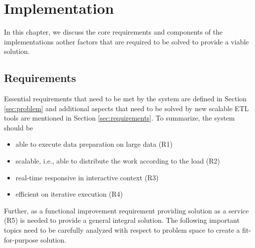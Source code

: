 
\chapter{Implementation} %
\label{Chapter3} %


In this chapter, we discuss the core requirements and components of the implementations aother factors that are required to be solved to provide a viable solution.  
\section{Requirements }
\label{sec:fundamentals}
Essential requirements that need to be met by the system are defined in Section \ref{sec:problem} and additional aspects that need to be solved by new scalable ETL tools are mentioned in Section \ref{sec:requirements}. To summarize, the system should be 
\begin{itemize}
\item  able to execute data preparation on large data (R1)
\item  scalable, i.e., able to distribute the work according to the load  (R2)
\item real-time responsive in interactive context (R3)
\item efficient on iterative execution (R4)
\end{itemize}
Further, as a functional improvement requirement providing solution as a service (R5) is needed to provide a general integral solution.  The following important topics need to be carefully analyzed with respect to problem space to create a fit-for-purpose solution. 

